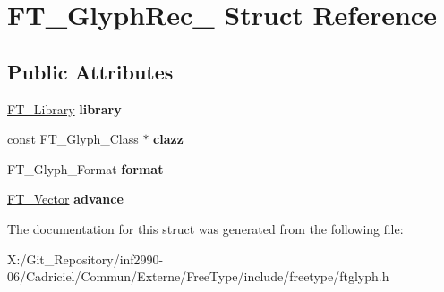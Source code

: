 \hypertarget{struct_f_t___glyph_rec__}{\section{F\-T\-\_\-\-Glyph\-Rec\-\_\- Struct Reference}
\label{struct_f_t___glyph_rec__}
}
\subsection*{Public Attributes}
\begin{DoxyCompactItemize}
\item 
\hypertarget{struct_f_t___glyph_rec___a00679b5e2519affab0f3999718817f8e}{\hyperlink{struct_f_t___library_rec__}{F\-T\-\_\-\-Library} {\bfseries library}}\label{struct_f_t___glyph_rec___a00679b5e2519affab0f3999718817f8e}

\item 
\hypertarget{struct_f_t___glyph_rec___ad7074cfe0e9fd6616e4dc4011e481524}{const F\-T\-\_\-\-Glyph\-\_\-\-Class $\ast$ {\bfseries clazz}}\label{struct_f_t___glyph_rec___ad7074cfe0e9fd6616e4dc4011e481524}

\item 
\hypertarget{struct_f_t___glyph_rec___a26b42a2610a69dcaed3e7c8b6d506211}{F\-T\-\_\-\-Glyph\-\_\-\-Format {\bfseries format}}\label{struct_f_t___glyph_rec___a26b42a2610a69dcaed3e7c8b6d506211}

\item 
\hypertarget{struct_f_t___glyph_rec___afd95b047df6a249db79018a279137018}{\hyperlink{struct_f_t___vector__}{F\-T\-\_\-\-Vector} {\bfseries advance}}\label{struct_f_t___glyph_rec___afd95b047df6a249db79018a279137018}

\end{DoxyCompactItemize}


The documentation for this struct was generated from the following file\-:\begin{DoxyCompactItemize}
\item 
X\-:/\-Git\-\_\-\-Repository/inf2990-\/06/\-Cadriciel/\-Commun/\-Externe/\-Free\-Type/include/freetype/ftglyph.\-h\end{DoxyCompactItemize}
